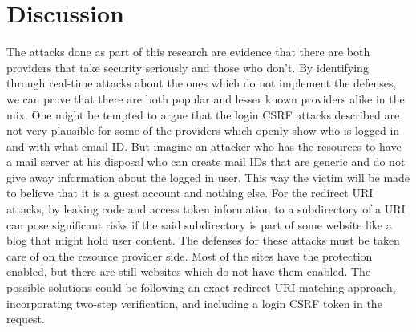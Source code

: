 \section{Discussion}
\label{sec:discussion}
The attacks done as part of this research are evidence that there are both providers that take security seriously and those who don't. By identifying through real-time attacks about the ones which do not implement the defenses, we can prove that there are both popular and lesser known providers alike in the mix. One might be tempted to argue that the login CSRF attacks described are not very plausible for some of the providers which openly show who is logged in and with what email ID. But imagine an attacker who has the resources to have a mail server at his disposal who can create mail IDs that are generic and do not give away information about the logged in user. This way the victim will be made to believe that it is a guest account and nothing else. For the redirect URI attacks, by leaking code and access token information to a subdirectory of a URI can pose significant risks if the said subdirectory is part of some website like a blog that might hold user content. The defenses for these attacks must be taken care of on the resource provider side. Most of the sites have the protection enabled, but there are still websites which do not have them enabled. The possible solutions could be following an exact redirect URI matching approach, incorporating two-step verification, and including a login CSRF token in the request.


